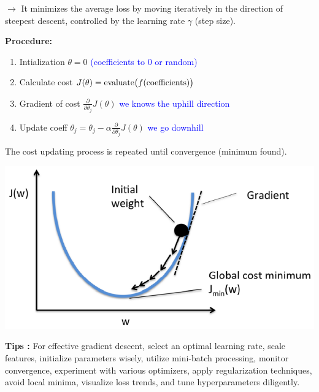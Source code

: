 \documentclass[letterpaper, 10.5pt,landscape]{article}
\begin{document}
\begin{multicols*}{3}
$\rightarrow$ It minimizes the average loss by moving iteratively in the direction of steepest descent, controlled by the learning rate $\gamma$ (step size). 

\textbf{Procedure: }
\begin{enumerate}
    \item Intialization  \hspace{14pt} \(\theta = 0\) \textcolor{blue}{(coefficients to 0 or random)}
    \item Calculate cost  \hspace{5pt} \(J(\theta) = \text{evaluate\big($f$(coefficients)}\big)\)
    \item Gradient of cost \hspace{-2pt} $\frac{\partial}{\partial \theta_{j}} J(\theta)$ \textcolor{blue}{we knows the uphill direction} 
    \item Update coeff \hspace{12pt} $\theta_{j} = \theta_{j} - \alpha \frac{\partial}{\partial \theta_{j}} J(\theta)$ \textcolor{blue}{we go downhill}
\end{enumerate}
The cost updating process is repeated until convergence (minimum found). 
\vspace{-7pt}
\begin{center}
    \begin{minipage}{0.75\linewidth}
        \includegraphics[width=\textwidth]{figures/gradient_decent.PNG}
    \end{minipage}    
\end{center}
\vspace{-5pt}

\textbf{Tips : }
For effective gradient descent, select an optimal learning rate, scale features, initialize parameters wisely, utilize mini-batch processing, monitor convergence, experiment with various optimizers, apply regularization techniques, avoid local minima, visualize loss trends, and tune hyperparameters diligently.


\end{multicols*}
\end{document}
